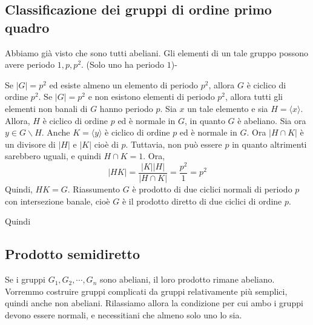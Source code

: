 \documentclass[a4paper]{article}
\begin{document}
\subsection{Classificazione dei gruppi di ordine primo quadro}

Abbiamo già visto che sono tutti abeliani.
Gli elementi di un tale gruppo possono avere periodo \(1, p, p^2\). (Solo uno ha periodo \(1\))-

Se \(|G| = p^2\) ed esiste almeno un elemento di periodo
\(p^2\), allora \(G\) è ciclico di ordine \(p^2\).
Se \(|G| = p^2\) e non esistono elementi di periodo \(p^2\),
allora tutti gli elementi non banali di \(G\) hanno periodo \(p\).
Sia \(x\) un tale elemento e sia \(H = \langle x \rangle\).
Allora, \(H\) è ciclico di ordine \(p\) ed è normale in \(G\), in quanto \(G\) è abeliano.
Sia ora \(y \in G \backslash H\). Anche \(K = \langle y \rangle\)
è ciclico di ordine \(p\) ed è normale in \(G\).
Ora \(|H \cap K|\) è un divisore di \(|H|\) e \(|K|\)
cioè di \(p\). Tuttavia, non può essere \(p\) in quanto altrimenti sarebbero uguali,
e quindi \(H \cap K = 1\).
Ora,
\[
    |HK| = \frac{|K||H|}{|H \cap K|} = \frac{p^2}{1} = p^2
\]
Quindi, \(HK = G\).
Riassumento \(G\) è prodotto di due ciclici normali
di periodo \(p\) con intersezione banale,
cioè \(G\) è il prodotto diretto di due ciclici di ordine \(p\).

Quindi

\subsection{Prodotto semidiretto}

Se i gruppi \(G_1, G_2, \cdots, G_n\)
sono abeliani, il loro prodotto rimane abeliano.
Vorremmo costruire gruppi complicati da gruppi relativamente più semplici, quindi anche non abeliani.
Rilassiamo allora la condizione per cui ambo i gruppi devono essere normali, e necessitiani che
almeno solo uno lo sia.

\end{document}
